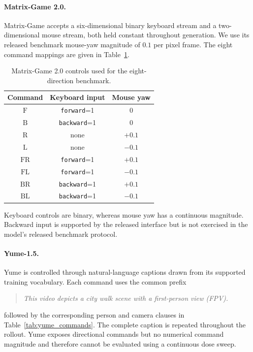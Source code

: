 \documentclass[letterpaper]{article} %
\begin{document}
\paragraph{Matrix-Game 2.0.}
Matrix-Game accepts a six-dimensional binary keyboard stream and a
two-dimensional mouse stream, both held constant throughout generation. We
use its released benchmark mouse-yaw magnitude of $0.1$ per pixel frame. The
eight command mappings are given in
Table~\ref{tab:matrix_game_commands}.

\begin{table}[t]
\centering
\small
\caption{Matrix-Game 2.0 controls used for the eight-direction benchmark.}
\label{tab:matrix_game_commands}
\begin{tabular}{ccc}
\toprule
Command & Keyboard input & Mouse yaw \\
\midrule
$\mathrm{F}$  & \texttt{forward}=1  & $0$ \\
$\mathrm{B}$  & \texttt{backward}=1 & $0$ \\
$\mathrm{R}$  & none                & $+0.1$ \\
$\mathrm{L}$  & none                & $-0.1$ \\
$\mathrm{FR}$ & \texttt{forward}=1  & $+0.1$ \\
$\mathrm{FL}$ & \texttt{forward}=1  & $-0.1$ \\
$\mathrm{BR}$ & \texttt{backward}=1 & $+0.1$ \\
$\mathrm{BL}$ & \texttt{backward}=1 & $-0.1$ \\
\bottomrule
\end{tabular}
\end{table}

Keyboard controls are binary, whereas mouse yaw has a continuous magnitude.
Backward input is supported by the released interface but is not exercised in
the model's released benchmark protocol.

\paragraph{Yume-1.5.}
Yume is controlled through natural-language captions drawn from its supported
training vocabulary. Each command uses the common prefix
\begin{quote}
\small
\emph{This video depicts a city walk scene with a first-person view (FPV).}
\end{quote}
followed by the corresponding person and camera clauses in
Table~\ref{tab:yume_commands}. The complete caption is repeated throughout
the rollout. Yume exposes directional commands but no numerical command
magnitude and therefore cannot be evaluated using a continuous dose sweep.
\end{document}

